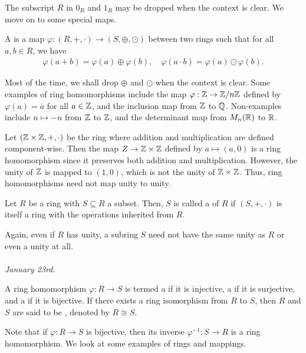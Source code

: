 The subscript $R$ in $0_{R}$ and $1_{R}$ may be dropped when the context is clear. We move on to some special maps.

\begin{definition}
    A  is a map $\varphi : (R, +, \cdot) \to (S, \oplus, \odot)$ between two rings such that for all $a, b \in R$, we have
    \begin{align}
        \varphi(a + b) = \varphi(a) \oplus \varphi(b), \quad \varphi(a \cdot b) = \varphi(a) \odot \varphi(b).
    \end{align}
\end{definition}
Most of the time, we shall drop $\oplus$ and $\odot$ when the context is clear. Some examples of ring homomorphisms include the map $\varphi : \mathbb{Z} \to \mathbb{Z}/n\mathbb{Z}$ defined by $\varphi(a) = \bar{a}$ for all $a \in \mathbb{Z}$, and the inclusion map from $\mathbb{Z}$ to $\mathbb{Q}$. Non-examples include $n \mapsto -n$ from $\mathbb{Z}$ to $\mathbb{Z}$, and the determinant map from $M_{n}(\mathbb{R})$ to $\mathbb{R}$.

Let $(\mathbb{Z} \times \mathbb{Z}, +, \cdot)$ be the ring where addition and multiplication are defined component-wise. Then the map $Z \to \mathbb{Z} \times \mathbb{Z}$ defined by $a \mapsto (a, 0)$ is a ring homomorphism since it preserves both addition and multiplication. However, the unity of $\mathbb{Z}$ is mapped to $(1, 0)$, which is not the unity of $\mathbb{Z} \times \mathbb{Z}$. Thus, ring homomorphisms need not map unity to unity.

\begin{definition}
    Let $R$ be a ring with $S \subseteq R$ a subset. Then, $S$ is called a  of $R$ if $(S, +, \cdot)$ is itself a ring with the operations inherited from $R$.
\end{definition}
Again, even if $R$ has unity, a subring $S$ need not have the same unity as $R$ or even a unity at all.
\\ \\
\textit{January 23rd.}

\begin{definition}
    A ring homomorphism $\varphi: R \to S$ is termed a  if it is injective, a  if it is surjective, and a  if it is bijective. If there exists a ring isomorphism from $R$ to $S$, then $R$ and $S$ are said to be , denoted by $R \cong S$.
\end{definition}

Note that if $\varphi: R \to S$ is bijective, then its inverse $\varphi^{-1} : S \to R$ is a ring homomorphism. We look at some examples of rings and mappings.

